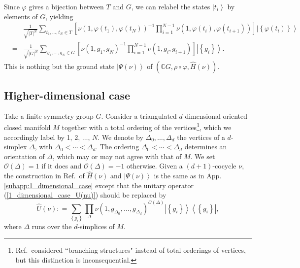 \documentclass[sort&compress]{elsarticle}
\theoremstyle{theoremstyle}
\theoremstyle{framedtheoremstyle}
\theoremstyle{definitionstyle}
\theoremstyle{definitionstyle}
\theoremstyle{definitionstyle}
\theoremstyle{definitionstyle}
\theoremstyle{nameddefinitionstyle}
\theoremstyle{framednameddefinitionstyle}
\theoremstyle{proofstyle}
\theoremstyle{definitionstyle}
\newcommand{\CCC}{\mathbb{C}}
\newcommand{\coloneq}{\mathrel{\mathop:}=}
\newcommand{\bars}[1]{\left| #1 \right|}
\newcommand{\paren}[1]{\left( #1 \right)}
\newcommand{\brackets}[1]{\left[ #1 \right]}
\newcommand{\braces}[1]{\left\{ #1 \right\}}
\newcommand{\ket}[1]{\left|#1\right\rangle}
\newcommand{\ketbra}[2]{\left| #1 \right\rangle\left\langle #2\right|}
\begin{document}
\begin{appendices}
\begin{equation}
\end{equation}
Since $\varphi$ gives a bijection between $T$ and $G$, we can relabel the states $\ket{t_i}$ by elements of $G$, yielding
\begin{eqnarray}
&& \frac{1}{ \sqrt{\bars{T}^N} }
\sum_{ t_1, \ldots, t_N\in T }
\brackets{ \nu \paren{1, \varphi(t_1), \varphi(t_N) }^{-1} \prod_{i=1}^{N-1} \nu \paren{ 1, \varphi(t_i), \varphi(t_{i+1}) } }
\ket{ \braces{\varphi(t_i)} }\nonumber\\
&=& \frac{1}{ \sqrt{\bars{G}^N} }
\sum_{ g_1, \ldots, g_N\in G }
\brackets{ \nu \paren{ 1, g_1, g_N }^{-1} \prod_{i=1}^{N-1} \nu \paren{ 1, g_i, g_{i+1} } }
\ket{ \braces{g_i} }.
\end{eqnarray}
This is nothing but the ground state $\ket{\Psi(\nu)}$ of $\paren{\CCC G, \rho\circ\varphi, \hat H(\nu)}$.





\subsection{Higher-dimensional case\label{subapp:higher_dimensional_case}}

Take a finite symmetry group $G$. Consider a triangulated $d$-dimensional oriented closed manifold $M$ together with a total ordering of the vertices\footnote{%
Ref.\,\cite{Wen_Boson} considered ``branching structures" instead of total orderings of vertices, but this distinction is inconsequential.}, which we accordingly label by 1, 2, $\ldots$, $N$.
We denote by $\Delta_0, \ldots, \Delta_d$ the vertices of a $d$-simplex $\Delta$, with $\Delta_0 < \cdots < \Delta_d$. The ordering $\Delta_0 < \cdots < \Delta_d$ determines an orientation of $\Delta$, which may or may not agree with that of $M$. We set $\mathcal O(\Delta)=1$ if it does and $\mathcal O(\Delta)=-1$ otherwise.
Given a $(d+1)$-cocycle $\nu$, the construction in Ref.\,\cite{Wen_Boson} of $\hat H(\nu)$ and $\ket{\Psi(\nu)}$ is the same as in App.\,\ref{subapp:1_dimensional_case} except that the unitary operator (\ref{1_dimensional_case_U(nu)}) should be replaced by
\begin{equation}
\hat U(\nu) \coloneq \sum_{\braces{g_i}} \prod_{\Delta} \nu \paren{1, g_{\Delta_0}, \ldots, g_{\Delta_d} }^{ \mathcal O(\Delta) } 
\ketbra{ \braces{g_i} }{ \braces{g_i} },
\end{equation}
where $\Delta$ runs over the $d$-simplices of $M$.






\end{appendices}
\end{document}
